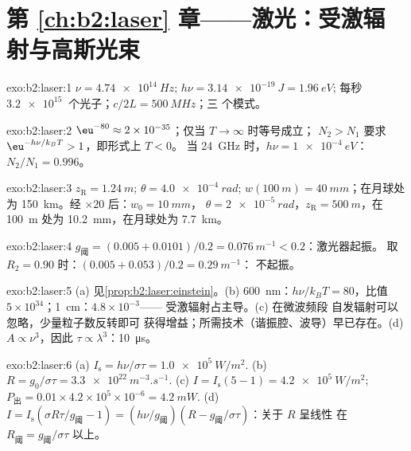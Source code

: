 \section*{第 \ref{ch:b2:laser} 章——激光：受激辐射与高斯光束}

\begin{solution}{exo:b2:laser:1}
$\nu = \qty{4.74e14}{Hz}$; $h\nu = \qty{3.14e-19}{J} = \qty{1.96}{eV}$;
每秒 $\qty{3.2e15}{}$ 个光子；$c/2L = \qty{500}{MHz}$；三
个模式。
\end{solution}

\begin{solution}{exo:b2:laser:2}
$\eu^{-80} \approx 2 \times 10^{-35}$；仅当 $T \to \infty$ 时等号成立；
$N_2 > N_1$ 要求 $\eu^{-h\nu/k_BT} > 1$，即形式上 $T < 0$。
当 \qty{24}{GHz} 时，$h\nu = \qty{1e-4}{eV}$：$N_2/N_1 = 0.996$。
\end{solution}

\begin{solution}{exo:b2:laser:3}
$z_{\text{R}} = \qty{1.24}{m}$; $\theta = \qty{4.0e-4}{rad}$; $w(\qty{100}{m}) =
\qty{40}{mm}$；在月球处为 \qty{150}{km}。经 $\times 20$ 后：$w_0 = \qty{10}{mm}$，
$\theta = \qty{2e-5}{rad}$，$z_{\text{R}} = \qty{500}{m}$，在
\qty{100}{m} 处为 \qty{10.2}{mm}，在月球处为 \qty{7.7}{km}。
\end{solution}

\begin{solution}{exo:b2:laser:4}
$g_{\text{阈}} = (0.005 + 0.0101)/0.2 = \qty{0.076}{m^{-1}} < 0.2$：激光器起振。
取 $R_2 = 0.90$ 时：$(0.005 + 0.053)/0.2 = \qty{0.29}{m^{-1}}$：
不起振。
\end{solution}

\begin{solution}{exo:b2:laser:5}
(a) 见\cref{prop:b2:laser:einstein}。(b) \qty{600}{nm}：$h\nu/k_BT
= 80$，比值 $5 \times 10^{34}$；\qty{1}{cm}：$4.8 \times 10^{-3}$——
受激辐射占主导。(c) 在微波频段
自发辐射可以忽略，少量粒子数反转即可
获得增益；所需技术（谐振腔、波导）早已存在。(d) $A \propto
\nu^3$，因此 $\tau \propto \lambda^3$：\qty{10}{\micro s}。
\end{solution}

\begin{solution}{exo:b2:laser:6}
(a) $I_{\text{s}} = h\nu/\sigma\tau = \qty{1.0e5}{W/m^2}$. (b) $R =
g_0/\sigma\tau = \qty{3.3e22}{m^{-3}.s^{-1}}$. (c) $I = I_{\text{s}}(5 - 1) =
\qty{4.2e5}{W/m^2}$; $P_{\text{出}} = 0.01 \times 4.2 \times 10^5 \times
10^{-6} = \qty{4.2}{mW}$. (d) $I = I_{\text{s}}(\sigma R\tau/g_{\text{阈}}
- 1) = (h\nu/g_{\text{阈}})(R - g_{\text{阈}}/\sigma\tau)$：关于 $R$ 呈线性
在 $R_{\text{阈}} = g_{\text{阈}}/\sigma\tau$ 以上。
\end{solution}

